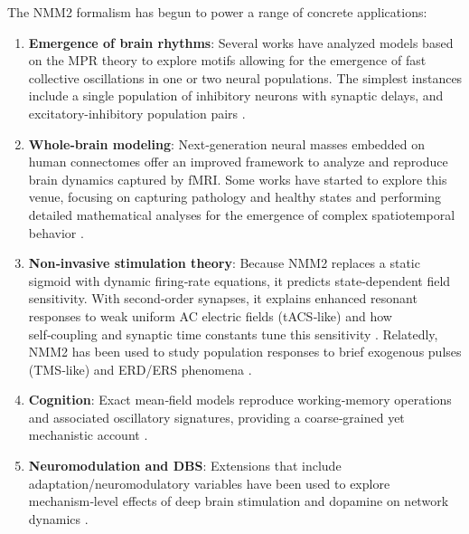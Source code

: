 \documentclass[12pt]{article}
\numberwithin{equation}{section}
\begin{document}
The NMM2 formalism has begun to power a range of concrete applications:
\begin{enumerate}
 \item \textbf{Emergence of brain rhythms}: Several works have analyzed models based on the MPR theory
 to explore motifs allowing for the emergence of fast collective oscillations in one or two neural populations. The simplest instances include a single population of inhibitory neurons with synaptic delays\cite{Devalle:2017aa,Dumont:2019aa,Bi2020,Clusella2023}, 
 and excitatory-inhibitory population pairs \cite{Dumont:2019aa,Byrne2020,segneri2020,ReynerParra2022}.
\item  \textbf{Whole‑brain modeling}: Next‑generation neural masses embedded on human connectomes offer an improved framework to analyze and reproduce brain dynamics captured by fMRI. 
    Some works have started to explore this venue, focusing on capturing pathology and healthy states \cite{Gerster2021,perl_whole-brain_2023,Forrester2024} and performing detailed mathematical analyses for the emergence of complex spatiotemporal behavior \cite{clusellaComplexSpatiotemporalOscillations2023,DelicadoMoll2025}.
 \item \textbf{Non‑invasive stimulation theory}: Because NMM2 replaces a static sigmoid with dynamic firing‑rate equations, it predicts state‑dependent field sensitivity. With second‑order synapses, it explains enhanced resonant responses to weak uniform AC electric fields (tACS‑like) and how self‑coupling and synaptic time constants tune this sensitivity \cite{Clusella2023}. Relatedly, NMM2 has been used to study population responses to brief exogenous pulses (TMS‑like) and ERD/ERS phenomena \cite{Byrne2020, Byrne2022}.
\item \textbf{Cognition}: Exact mean‑field models reproduce working‑memory operations and associated oscillatory signatures, providing a coarse‑grained yet mechanistic account \cite{Schmidt2018,Taher2020}.
\item \textbf{Neuromodulation and DBS}: Extensions that include adaptation/neuromodulatory variables have been used to explore mechanism‑level effects of deep brain stimulation and dopamine on network dynamics \cite{Depannemaecker2024, Chen2022}.
\end{enumerate}
\end{document}
